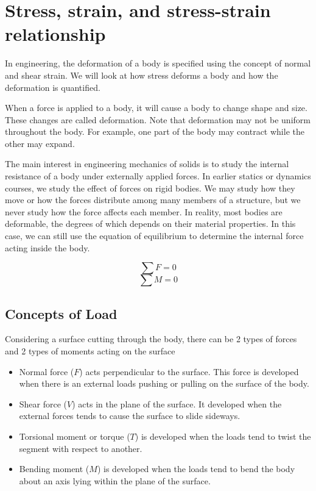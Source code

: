 \documentclass[
10pt,
a4paper,
openany,
svgnames,
]{book}
\begin{document}
\section{Stress, strain, and stress-strain relationship}

In engineering, the deformation of a body is specified using the concept of normal and shear strain. We will look at how stress deforms a body and how the deformation is quantified.

When a force is applied to a body, it will cause a body to change shape and size. These changes are called deformation. Note that deformation may not be uniform throughout the body. For example, one part of the body may contract while the other may expand.

The main interest in engineering mechanics of solids is to study the internal resistance of a body under externally applied forces. In earlier statics or dynamics courses, we study the effect of forces on rigid bodies. We may study how they move or how the forces distribute among many members of a structure, but we never study how the force affects each member. In reality, most bodies are deformable, the degrees of which depends on their material properties. In this case, we can still use the equation of equilibrium to determine the internal force acting inside the body.

$$ \sum F = 0 $$
$$ \sum M = 0 $$

\subsection{Concepts of Load}

Considering a surface cutting through the body, there can be 2 types of forces and 2 types of moments acting on the surface

\begin{itemize}
\item Normal force ($F$) acts perpendicular to the surface. This force is developed when there is an external loads pushing or pulling on the surface of the body.
\item Shear force ($V$) acts in the plane of the surface. It developed when the external forces tends to cause the surface to slide sideways.
\item Torsional moment or torque ($T$) is developed when the loads tend to twist the segment with respect to another.
\item Bending moment ($M$) is developed when the loads tend to bend the body about an axis lying within the plane of the surface.
\end{itemize}
\end{document}
